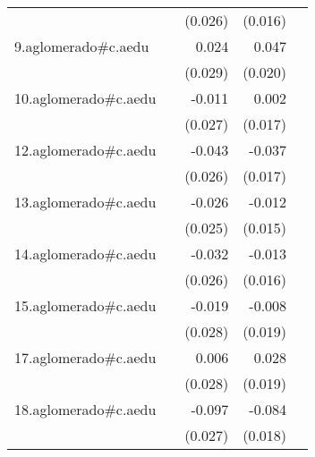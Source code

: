 {\begin{longtable}{l*{4}{D{.}{.}{-1}}}
            &                     &     (0.026)         &     (0.016)         &                     \\
\addlinespace
9.aglomerado#c.aedu&                     &       0.024         &       0.047\sym{*}  &                     \\
            &                     &     (0.029)         &     (0.020)         &                     \\
\addlinespace
10.aglomerado#c.aedu&                     &      -0.011         &       0.002         &                     \\
            &                     &     (0.027)         &     (0.017)         &                     \\
\addlinespace
12.aglomerado#c.aedu&                     &      -0.043         &      -0.037\sym{*}  &                     \\
            &                     &     (0.026)         &     (0.017)         &                     \\
\addlinespace
13.aglomerado#c.aedu&                     &      -0.026         &      -0.012         &                     \\
            &                     &     (0.025)         &     (0.015)         &                     \\
\addlinespace
14.aglomerado#c.aedu&                     &      -0.032         &      -0.013         &                     \\
            &                     &     (0.026)         &     (0.016)         &                     \\
\addlinespace
15.aglomerado#c.aedu&                     &      -0.019         &      -0.008         &                     \\
            &                     &     (0.028)         &     (0.019)         &                     \\
\addlinespace
17.aglomerado#c.aedu&                     &       0.006         &       0.028         &                     \\
            &                     &     (0.028)         &     (0.019)         &                     \\
\addlinespace
18.aglomerado#c.aedu&                     &      -0.097\sym{***}&      -0.084\sym{***}&                     \\
            &                     &     (0.027)         &     (0.018)         &                     \\

\end{longtable}}
